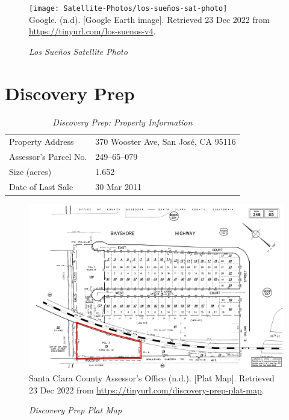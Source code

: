 \begin{figure}[hbtp]
  \caption[Los Sueños Satellite Photo]{\textit{Los Sueños Satellite Photo}}\label{fig:los-sueños-sat-photo}
  \texttt{[image: Satellite-Photos/los-sueños-sat-photo]}\\ %
  \footnotesize{Google. (n.d). [Google Earth image]. Retrieved 23 Dec 2022 from \url{https://tinyurl.com/los-suenos-v4}.}
\end{figure}


\clearpage
\section{Discovery Prep}\label{sec:discover-prep-info}\indent

\begin{table}[htbp]
  \SingleSpacing%
  \caption[Discovery Prep: Property Information]{\textit{Discovery Prep: Property Information}}\label{tab:discovery-prep-prop-info}
  \begin{tabular}{ll}
    \toprule
    Property Address      & 370 Wooster Ave, San José, CA 95116 \\
    Assessor's Parcel No. &  249–65–079 \\
    Size (acres)          & 1.652 \\
    Date of Last Sale     & 30 Mar 2011\\
    \bottomrule
  \end{tabular}
\end{table}

\begin{figure}[hbtp]
    \caption[Discovery Prep Plat Map]{\textit{Discovery Prep Plat Map}}\label{fig:discovery-prep-plat-map}
    \includegraphics[width=\textwidth]{Assessor-Info/discovery-prep-plat-map-249-65}\\ %
    \footnotesize{Santa Clara County Assessor's Office (n.d.). [Plat Map]. Retrieved 23 Dec 2022 from  \url{https://tinyurl.com/discovery-prep-plat-map}}.
\end{figure}

